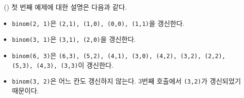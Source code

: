 \begin{problem}{\kcpcpprobbinom\ (\kcpcpprobbinomshort)}
    \Explanation
    첫 번째 예제에 대한 설명은 다음과 같다.
    \begin{itemize}
        \item \verb|binom(2, 1)|은 \verb|(2,1), (1,0), (0,0), (1,1)|을 갱신한다.
        \item \verb|binom(3, 1)|은 \verb|(3,1), (2,0)|을 갱신한다.
        \item \verb|binom(6, 3)|은 \verb|(6,3), (5,2), (4,1), (3,0), (4,2), (3,2), (2,2), (5,3), (4,3), (3,3)|이 갱신한다.
        \item \verb|binom(3, 2)|은 어느 칸도 갱신하지 않는다. 3번째 호출에서 \verb|(3,2)|가 갱신되었기 때문이다.
    \end{itemize}

\end{problem}

